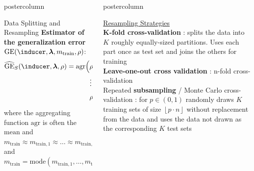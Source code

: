 \documentclass{beamer}
\newlength{\columnheight} %
\begin{document}
\begin{frame}[fragile]{}
\begin{columns}
\begin{column}{.31\textwidth}
\begin{beamercolorbox}[center]{postercolumn}
\begin{minipage}{.98\textwidth}
{\begin{myblock}{Data Splitting and Resampling}
\textbf{Estimator of the generalization error} $\mathrm{GE}(\inducer, \bm{\lambda}, m_\mathrm{train}, \rho)$:
\begin{equation*}
\begin{split}
\widehat{\mathrm{GE}}_S(\inducer, \boldsymbol\lambda, \rho) = \mathrm{agr}\Big(
 &\rho\Big(\boldsymbol{y}_{J_{\mathrm{test},1}}, \boldsymbol{F}_{J_{\mathrm{test},1},f_{\mathcal{D}_{\mathrm{train},1}, \boldsymbol\lambda}}\Big), \\ &\large{\vdots} \\
& \rho\Big(\boldsymbol{y}_{J_{\mathrm{test},K}}, \boldsymbol{F}_{J_{\mathrm{test},K},
f_{\mathcal{D}_{\mathrm{train},K}, \boldsymbol\lambda}}\Big)
    \Big),
\end{split}
\end{equation*}
where the aggregating function $\mathrm{agr}$ is often the $\textrm{mean}$ and
$m_{\mathrm{train}} \approx m_{\mathrm{train},1} \approx \dots \approx m_{\mathrm{train},K}$ and $m_{\mathrm{train}} = \mathrm{mode}(m_{\mathrm{train},1}, \dots, m_{\mathrm{train},K})$
\end{myblock}
\vfill
				}
			\end{minipage}
		\end{beamercolorbox}
	\end{column}
	\begin{column}{.31\textwidth}
		\begin{beamercolorbox}[center]{postercolumn}
			\begin{minipage}{.98\textwidth}
				\parbox[t][\columnheight]{\textwidth}{
\underline{Resampling Strategies}\\

\textbf{K-fold cross-validation} : splits the data into $K$ roughly equally-sized partitions.
Uses each part once as test set and joins the others for training\\ 

\textbf{Leave-one-out cross validation}  : n-fold cross-validation\\

Repeated \textbf{subsampling} / Monte Carlo cross-validation : for $p \in (0,1)$ randomly draws $K$ training sets of size $\left \lfloor{p\cdot n}\right \rfloor $ without replacement from the data and uses the data not drawn as the corresponding $K$ test sets\\ 

}
\end{minipage}
\end{beamercolorbox}
\end{column}
\end{columns}
\end{frame}
\end{document}
